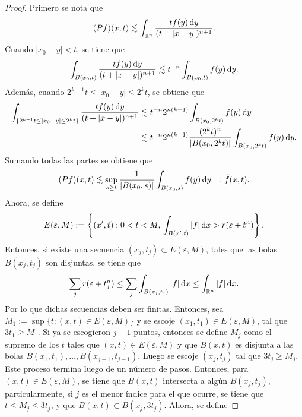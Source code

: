 \begin{proof}
	Primero se nota que 
	\begin{equation*}
		(Pf)(x, t) \lesssim \int_{\mathbb{R}^n} \frac{tf(y)\mathop{}\!\mathrm{d} y}{(t + |x-y|)^{n+1}}.
	\end{equation*}
	Cuando $|x_0-y|<t$, se tiene que
	\begin{equation*}
		\int_{B(x_0, t)} \frac{tf(y)\mathop{}\!\mathrm{d} y}{(t + |x-y|)^{n+1}} \lesssim t^{-n}  \int_{B(x_0, t)}  f(y)\mathop{}\!\mathrm{d} y.
	\end{equation*}
	Además, cuando $2^{k-1}t \leq |x_0-y|\leq 2^kt$, se obtiene que
	\begin{align*}
		\int_{\{2^{k-1}t \leq |x_0-y|\leq 2^kt\}} \frac{tf(y)\mathop{}\!\mathrm{d} y}{(t + |x-y|)^{n+1}}& \lesssim t^{-n}2^{n(k-1)}  \int_{B(x_0, 2^kt)} f(y)\mathop{}\!\mathrm{d} y \\
		& \lesssim t^{-n}2^{n(k-1)} \frac{(2^kt)^{n}}{|B(x_0, 2^kt)|} \int_{B(x_0, 2^kt)}  f(y)\mathop{}\!\mathrm{d} y.
	\end{align*}
	Sumando todas las partes se obtiene que 
	\begin{equation*}
		(Pf)(x, t) \lesssim \sup_{s\geq t}  \frac{1}{|B(x_0, s)|}\int_{B(x_0, s)}f(y) \mathop{}\!\mathrm{d} y =: \tilde{f}(x, t).
	\end{equation*}
	Ahora, se define 
	\begin{equation*}
		E(\varepsilon, M) := \left\{ (x', t) : 0<t<M, \, \int_{B(x', t)} |f|\mathop{}\!\mathrm{d} x > r(\varepsilon + t^n) \right\}.
	\end{equation*}
	Entonces, si existe una secuencia $(x_j, t_j) \subset E(\varepsilon, M)$, tales que las bolas $B(x_j, t_j)$ son disjuntas, se tiene que
	\begin{equation*}
		\sum_j r(\varepsilon + t_j^n) \leq \sum_j \int_{B(x_j, t_j)} |f| \mathop{}\!\mathrm{d} x\leq \int_{\mathbb{R}^n} |f| \mathop{}\!\mathrm{d} x.
	\end{equation*} 
	Por lo que dichas secuencias deben ser finitas. Entonces, sea $M_1 := \sup\{t:(x, t)\in E(\varepsilon, M)\}$ y se escoje $(x_1, t_1)\in E(\varepsilon, M)$, tal que $3t_1 \geq M_1$. Si ya se escogieron $j-1$ puntos, entonces se define $M_j$ como el supremo de los $t$ tales que $(x, t)\in E(\varepsilon, M)$ y que $B(x, t)$ es disjunta a las bolas $B(x_1, t_1),\ldots,B(x_{j-1}, t_{j-1})$. Luego se escoje $(x_j, t_j)$ tal que $3t_j \geq M_j$. Este proceso termina luego de un número de pasos. Entonces, para $(x, t)\in E(\varepsilon, M)$, se tiene que $B(x, t)$ intersecta a algún $B(x_j, t_j)$, particularmente, si $j$ es el menor índice para el que ocurre, se tiene que $t\leq M_j \leq 3t_j$, y que $B(x, t) \subset B(x_j, 3t_j)$. Ahora, se define

\end{proof}
